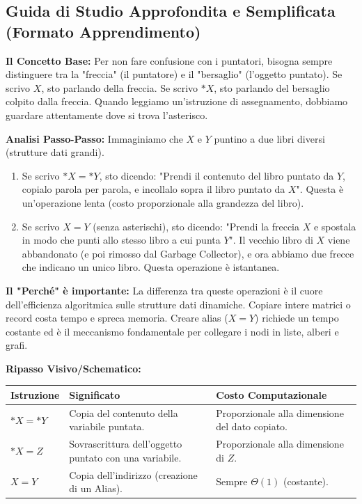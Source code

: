 \documentclass[a4paper, 11pt]{report}
\begin{document}
\vspace{0.5cm}
\subsection*{Guida di Studio Approfondita e Semplificata (Formato Apprendimento)}


\textbf{Il Concetto Base:}
Per non fare confusione con i puntatori, bisogna sempre distinguere tra la "freccia" (il puntatore) e il "bersaglio" (l'oggetto puntato). Se scrivo $X$, sto parlando della freccia. Se scrivo $*X$, sto parlando del bersaglio colpito dalla freccia. Quando leggiamo un'istruzione di assegnamento, dobbiamo guardare attentamente dove si trova l'asterisco.

\textbf{Analisi Passo-Passo:}
Immaginiamo che $X$ e $Y$ puntino a due libri diversi (strutture dati grandi).
\begin{enumerate}
    \item Se scrivo $*X = *Y$, sto dicendo: "Prendi il contenuto del libro puntato da $Y$, copialo parola per parola, e incollalo sopra il libro puntato da $X$". Questa è un'operazione lenta (costo proporzionale alla grandezza del libro).
    \item Se scrivo $X = Y$ (senza asterischi), sto dicendo: "Prendi la freccia $X$ e spostala in modo che punti allo stesso libro a cui punta $Y$". Il vecchio libro di $X$ viene abbandonato (e poi rimosso dal Garbage Collector), e ora abbiamo due frecce che indicano un unico libro. Questa operazione è istantanea.
\end{enumerate}

\textbf{Il "Perché" è importante:}
La differenza tra queste operazioni è il cuore dell'efficienza algoritmica sulle strutture dati dinamiche. Copiare intere matrici o record costa tempo e spreca memoria. Creare alias ($X=Y$) richiede un tempo costante ed è il meccanismo fondamentale per collegare i nodi in liste, alberi e grafi.

\textbf{Ripasso Visivo/Schematico:}
\begin{center}
\begin{tabular}{|l|p{5cm}|p{6cm}|}
\hline
\textbf{Istruzione} & \textbf{Significato} & \textbf{Costo Computazionale} \\
\hline
$*X = *Y$ & Copia del contenuto della variabile puntata. & Proporzionale alla dimensione del dato copiato. \\
\hline
$*X = Z$ & Sovrascrittura dell'oggetto puntato con una variabile. & Proporzionale alla dimensione di $Z$. \\
\hline
$X = Y$ & Copia dell'indirizzo (creazione di un Alias). & Sempre $\Theta(1)$ (costante). \\
\hline
\end{tabular}
\end{center}
\end{document}
